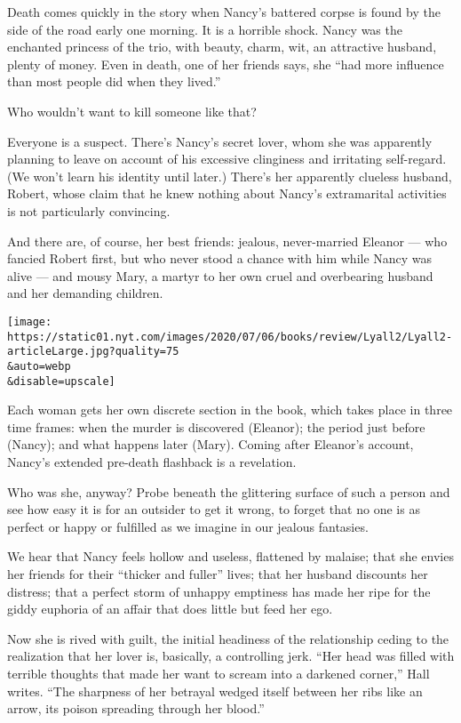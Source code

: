 Death comes quickly in the story when Nancy's battered corpse is found
by the side of the road early one morning. It is a horrible shock. Nancy
was the enchanted princess of the trio, with beauty, charm, wit, an
attractive husband, plenty of money. Even in death, one of her friends
says, she ``had more influence than most people did when they lived.''

Who wouldn't want to kill someone like that?

Everyone is a suspect. There's Nancy's secret lover, whom she was
apparently planning to leave on account of his excessive clinginess and
irritating self-regard. (We won't learn his identity until later.)
There's her apparently clueless husband, Robert, whose claim that he
knew nothing about Nancy's extramarital activities is not particularly
convincing.

And there are, of course, her best friends: jealous, never-married
Eleanor --- who fancied Robert first, but who never stood a chance with
him while Nancy was alive --- and mousy Mary, a martyr to her own cruel
and overbearing husband and her demanding children.

\texttt{[image: https://static01.nyt.com/images/2020/07/06/books/review/Lyall2/Lyall2-articleLarge.jpg?quality=75\\\&auto=webp\\\&disable=upscale]}

Each woman gets her own discrete section in the book, which takes place
in three time frames: when the murder is discovered (Eleanor); the
period just before (Nancy); and what happens later (Mary). Coming after
Eleanor's account, Nancy's extended pre-death flashback is a revelation.

Who was she, anyway? Probe beneath the glittering surface of such a
person and see how easy it is for an outsider to get it wrong, to forget
that no one is as perfect or happy or fulfilled as we imagine in our
jealous fantasies.

We hear that Nancy feels hollow and useless, flattened by malaise; that
she envies her friends for their ``thicker and fuller'' lives; that her
husband discounts her distress; that a perfect storm of unhappy
emptiness has made her ripe for the giddy euphoria of an affair that
does little but feed her ego.

Now she is rived with guilt, the initial headiness of the relationship
ceding to the realization that her lover is, basically, a controlling
jerk. ``Her head was filled with terrible thoughts that made her want to
scream into a darkened corner,'' Hall writes. ``The sharpness of her
betrayal wedged itself between her ribs like an arrow, its poison
spreading through her blood.''

